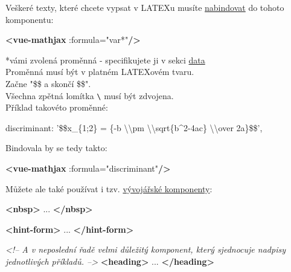 \documentclass[
]{article}
\newenvironment{Shaded}{}{}
\newcommand{\CommentTok}[1]{\textcolor[rgb]{0.38,0.63,0.69}{\textit{#1}}}
\newcommand{\KeywordTok}[1]{\textcolor[rgb]{0.00,0.44,0.13}{\textbf{#1}}}
\newcommand{\NormalTok}[1]{#1}
\newcommand{\OperatorTok}[1]{\textcolor[rgb]{0.40,0.40,0.40}{#1}}
\newcommand{\OtherTok}[1]{\textcolor[rgb]{0.00,0.44,0.13}{#1}}
\newcommand{\SpecialCharTok}[1]{\textcolor[rgb]{0.25,0.44,0.63}{#1}}
\newcommand{\StringTok}[1]{\textcolor[rgb]{0.25,0.44,0.63}{#1}}
\begin{document}
Veškeré texty, které chcete vypsat v LATEXu musíte
\protect\hyperlink{Bind}{nabindovat} do tohoto komponentu:

\begin{Shaded}
\begin{Highlighting}[]
\KeywordTok{<vue-mathjax}\OtherTok{ :formula=}\StringTok{"var*"}\KeywordTok{/>}
\end{Highlighting}
\end{Shaded}

*vámi zvolená proměnná - specifikujete ji v sekci
\protect\hyperlink{data}{data}\\
Proměnná musí být v platném LATEXovém tvaru.\\
Začne "\$\$ a skončí \$\$".\\
Všechna zpětná lomítka \texttt{\textbackslash{}} musí být zdvojena.\\
Příklad takovéto proměnné:

\begin{Shaded}
\begin{Highlighting}[]
\NormalTok{discriminant}\OperatorTok{:} \StringTok{'\$\$x_\{1;2\} = \{-b }\SpecialCharTok{\textbackslash{}\textbackslash{}}\StringTok{pm }\SpecialCharTok{\textbackslash{}\textbackslash{}}\StringTok{sqrt\{b^2-4ac\} }\SpecialCharTok{\textbackslash{}\textbackslash{}}\StringTok{over 2a\}\$\$'}\OperatorTok{,}
\end{Highlighting}
\end{Shaded}

Bindovala by se tedy takto:

\begin{Shaded}
\begin{Highlighting}[]
\KeywordTok{<vue-mathjax}\OtherTok{ :formula=}\StringTok{"discriminant"}\KeywordTok{/>}
\end{Highlighting}
\end{Shaded}

Můžete ale také používat i tzv.
\protect\hyperlink{vuxfdvojuxe1ux159skuxe9-komponenty}{vývojářské
komponenty}:

\begin{Shaded}
\begin{Highlighting}[]
\KeywordTok{<nbsp>}
\NormalTok{    ...}
\KeywordTok{</nbsp>}

\KeywordTok{<hint-form>}
\NormalTok{    ...}
\KeywordTok{</hint-form>}

\CommentTok{<!-- A v neposlední řadě velmi důležitý komponent, který sjednocuje nadpisy}
\CommentTok{jednotlivých příkladů. -->}
\KeywordTok{<heading>}
\NormalTok{    ...}
\KeywordTok{</heading>}
\end{Highlighting}
\end{Shaded}
\end{document}
